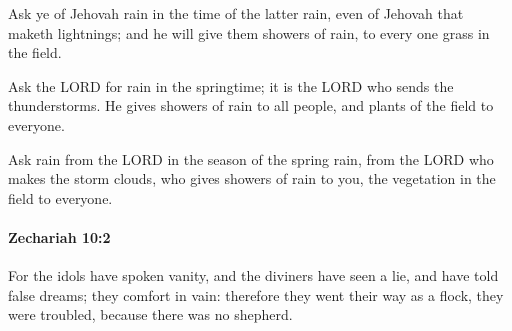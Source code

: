 			\begin{versebox}
					\item[BHS] 
					\item[LXX] 
					\item[ASV] Ask ye of Jehovah rain in the time of the latter rain, even of Jehovah that maketh lightnings; and he will give them showers of rain, to every one grass in the field.
					\item[NIV] Ask the LORD for rain in the springtime; it is the LORD who sends the thunderstorms. He gives showers of rain to all people, and plants of the field to everyone.
					\item[NRSV] Ask rain from the LORD in the season of the spring rain, from the LORD who makes the storm clouds, who gives showers of rain to you, the vegetation in the field to everyone.
			\end{versebox}

		\paragraph{Zechariah 10:2} %
			\label{ZECHARIAH-10-2}

			For the idols have spoken vanity, and the diviners have seen a lie, and have told false dreams; they comfort in vain: therefore they went their way as a flock, they were troubled, because there was no shepherd.

